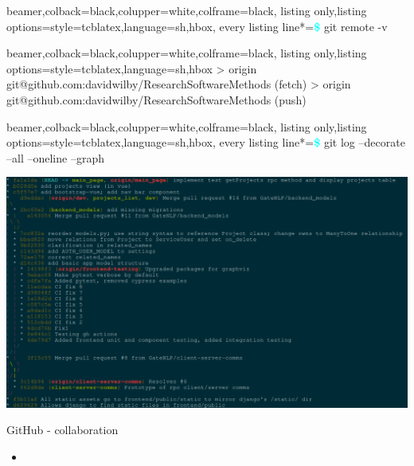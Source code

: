 \documentclass{beamer} %
\begin{document}
  \begin{frame}[fragile]
    
    \begin{tcblisting}{beamer,colback=black,colupper=white,colframe=black,
      listing only,listing options={style=tcblatex,language=sh},hbox,
      every listing line*={\textcolor{cyan}{\small\ttfamily\bfseries\$}}}
  git remote -v
    \end{tcblisting}
    
    \begin{tcblisting}{beamer,colback=black,colupper=white,colframe=black,
      listing only,listing options={style=tcblatex,language=sh},hbox}
> origin git@github.com:davidwilby/ResearchSoftwareMethods (fetch)
> origin git@github.com:davidwilby/ResearchSoftwareMethods (push)
    \end{tcblisting}

  \end{frame}

  \begin{frame}[fragile]
    \begin{tcblisting}{beamer,colback=black,colupper=white,colframe=black,
      listing only,listing options={style=tcblatex,language=sh},hbox,
      every listing line*={\textcolor{cyan}{\small\ttfamily\bfseries\$}}}
  git log --decorate --all --oneline --graph
    \end{tcblisting}
    \includegraphics[height=.9\textheight]{git_log_tree_output.png}
  \end{frame}


  \begin{frame}{GitHub - collaboration}
    \begin{itemize}
      \item 
    \end{itemize}
  \end{frame}
\end{document}
